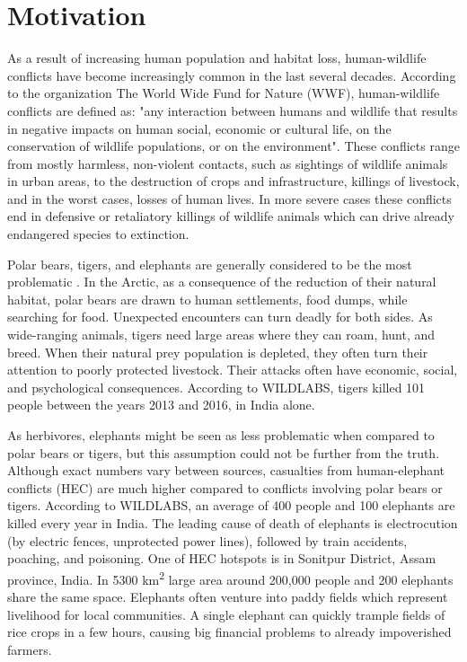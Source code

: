 \section{ Motivation}

As a result of increasing human population and habitat loss, human-wildlife conflicts have become increasingly common in the last several decades\cite{philip-wildlife}.
According to the organization The World Wide Fund for Nature (WWF), human-wildlife conflicts are defined as: "any interaction between humans and wildlife that results in negative impacts on human social, economic or cultural life, on the conservation of wildlife populations, or on the environment"\cite{conflict-manual}.
These conflicts range from mostly harmless, non-violent contacts, such as sightings of wildlife animals in urban areas, to the destruction of crops and infrastructure, killings of livestock, and in the worst cases, losses of human lives.
In more severe cases these conflicts end in defensive or retaliatory killings of wildlife animals which can drive already endangered species to extinction.

Polar bears, tigers, and elephants are generally considered to be the most problematic \cite{philip-wildlife}.
In the Arctic, as a consequence of the reduction of their natural habitat, polar bears are drawn to human settlements, food dumps, while searching for food\cite{wildlabs-polarbears}.
Unexpected encounters can turn deadly for both sides.
As wide-ranging animals, tigers need large areas where they can roam, hunt, and breed\cite{wildlabs-tigers}.
When their natural prey population is depleted, they often turn their attention to poorly protected livestock. 
Their attacks often have economic, social, and psychological consequences.
According to WILDLABS, tigers killed 101 people between the years 2013 and 2016, in India alone\cite{wildlabs-tigers}.

As herbivores, elephants might be seen as less problematic when compared to polar bears or tigers, but this assumption could not be further from the truth.
Although exact numbers vary between sources, casualties from human-elephant conflicts (HEC) are much higher compared to conflicts involving polar bears or tigers.
According to WILDLABS, an average of 400 people and 100 elephants are killed every year in India\cite{wildlabs-elephants}. 
The leading cause of death of elephants is electrocution (by electric fences, unprotected power lines), followed by train accidents, poaching, and poisoning\cite{cause-of-death}.
One of HEC hotspots is in Sonitpur District, Assam province, India. 
In 5300 km\textsuperscript{2} large area around 200,000 people and 200 elephants share the same space\cite{wildlabs-elephants}.
Elephants often venture into paddy fields which represent livelihood for local communities.
A single elephant can quickly trample fields of rice crops in a few hours, causing big financial problems to already impoverished farmers\cite{wildlabs-elephants}.

